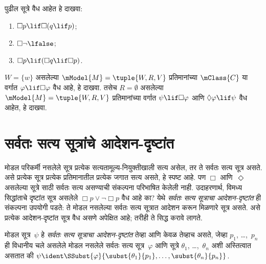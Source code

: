 \begin{prob}
  पुढील सूत्रे वैध आहेत हे दाखवा:
  \begin{enumerate}
  \item $\Box p \lif \Box (q \lif p)$;
  \item $\Box \lnot \lfalse$;
  \item $\Box p \lif (\Box q \lif \Box p)$.
  \end{enumerate}
\end{prob}

\begin{prob}
  $W = \{w\}$ असलेल्या $\mModel{M} = \tuple{W, R, V}$
  प्रतिमानांच्या $\mClass{C}$ या वर्गात $\varphi \lif \Box\varphi$
  वैध आहे, हे दाखवा. तसेच $R = \emptyset$ असलेल्या
  $\mModel{M} = \tuple{W, R, V}$ प्रतिमानांच्या वर्गात
  $\psi \lif \Box \varphi$ आणि $\Diamond \varphi \lif \psi$ वैध
  आहेत, हे दाखवा.
\end{prob}












\section{सर्वतः सत्य सूत्रांचे आदेशन-दृष्टांत}\label{nml:syn:tau:sec}

\begin{explain}
मोडल परिकर्मी नसलेले सूत्र प्रत्येक सत्यतामूल्य-नियुक्तीखाली
सत्य असेल, तर ते सर्वतः सत्य सूत्र असते. असे प्रत्येक सूत्र
प्रत्येक प्रतिमानातील प्रत्येक जगात सत्य असते, हे स्पष्ट आहे.
पण $\Box$ आणि~$\Diamond$ असलेल्या सूत्रे साठी
सर्वतः सत्य असण्याची संकल्पना परिभाषित केलेली नाही.
उदाहरणार्थ, विमध्य सिद्धांताचे दृष्टांत सूत्र असलेले
$\Box p \lor \lnot \Box p$ वैध आहे का? येथे
\emph{सर्वतः सत्य सूत्राचा आदेशन-दृष्टांत} ही
संकल्पना उपयोगी पडते: ते मोडल नसलेल्या सर्वतः सत्य
सूत्रात आदेशन करून मिळणारे सूत्र असते. असे
प्रत्येक आदेशन-दृष्टांत सूत्र वैध असणे अपेक्षित आहे;
तरीही ते सिद्ध करावे लागते.
\end{explain}

\begin{defn}
  मोडल सूत्र~$\psi$ हे \emph{सर्वतः सत्य सूत्राचा
  आदेशन-दृष्टांत} तेव्हा आणि केवळ तेव्हाच असते,
  जेव्हा $p_1$, \dots,~$p_n$ ही विधानीय चले असलेले मोडल नसलेले सर्वतः सत्य सूत्र~$\varphi$
  आणि सूत्रे $\theta_1$, \dots,~$\theta_n$ अशी अस्तित्वात
  असतात की $\psi \ident \SSubst{\varphi}{\subst{\theta_1}{p_1},
    \dots, \subst{\theta_n}{p_n}}$.
\end{defn}


